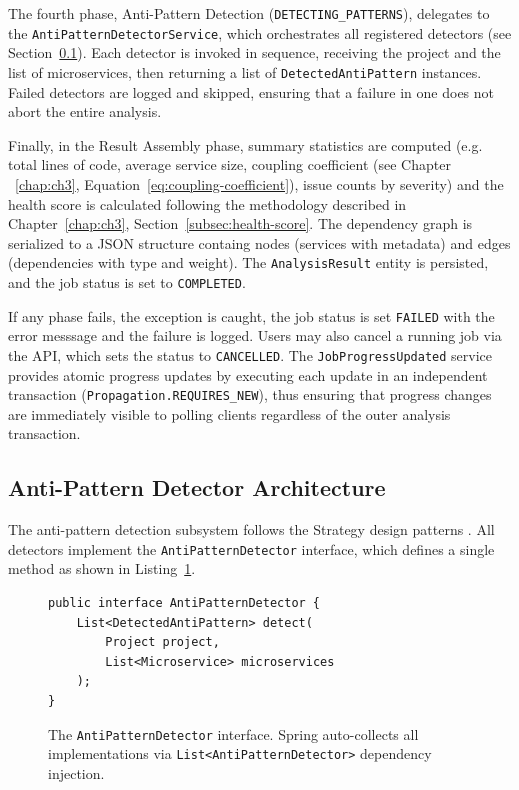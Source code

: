 The fourth phase, Anti-Pattern Detection (\texttt{DETECTING\_PATTERNS}), delegates to the \texttt{AntiPatternDetectorService}, which orchestrates all registered detectors (see Section~\ref{subsec:detector-architecture}). Each detector is invoked in sequence, receiving the project and the list of microservices, then returning a list of \texttt{DetectedAntiPattern} instances. Failed detectors are logged and skipped, ensuring that a failure in one does not abort the entire analysis.

Finally, in the Result Assembly phase, summary statistics are computed (e.g. total lines of code, average service size, coupling coefficient (see Chapter ~\ref{chap:ch3}, Equation~\ref{eq:coupling-coefficient}), issue counts by severity) and the health score is calculated following the methodology described in Chapter~\ref{chap:ch3}, Section~\ref{subsec:health-score}. The dependency graph is serialized to a JSON structure containg nodes (services with metadata) and edges (dependencies with type and weight). The \texttt{AnalysisResult} entity is persisted, and the job status is set to \texttt{COMPLETED}.

If any phase fails, the exception is caught, the job status is set \texttt{FAILED} with the error messsage and the failure is logged. Users may also cancel a running job via the API, which sets the status to \texttt{CANCELLED}. The \texttt{JobProgressUpdated} service provides atomic progress updates by executing each update in an independent transaction (\texttt{Propagation.REQUIRES\_NEW}), thus ensuring that progress changes are immediately visible to polling clients regardless of the outer analysis transaction.

\subsection{Anti-Pattern Detector Architecture}
\label{subsec:detector-architecture}

\par The anti-pattern detection subsystem follows the Strategy design patterns \cite{Gamma1994}. All detectors implement the \texttt{AntiPatternDetector} interface, which defines a single method as shown in Listing~\ref{lst:detector-interface}.

\begin{figure}[htbp]
    \begin{verbatim}
public interface AntiPatternDetector {
    List<DetectedAntiPattern> detect(
        Project project,
        List<Microservice> microservices
    );
}
    \end{verbatim}
    \caption{The \texttt{AntiPatternDetector} interface. Spring auto-collects all implementations via \texttt{List<AntiPatternDetector>} dependency injection.}
    \label{lst:detector-interface}
\end{figure}

